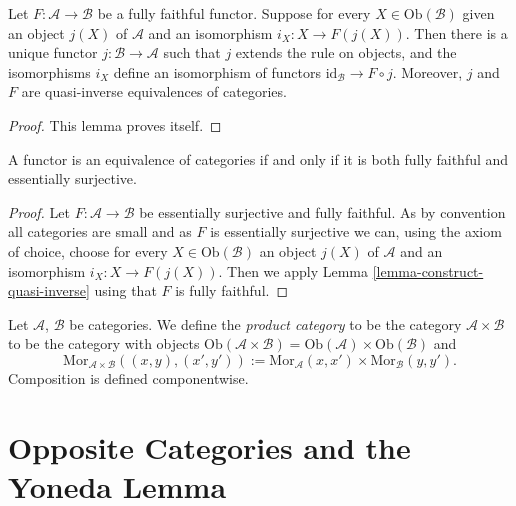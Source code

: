 \begin{lemma}
\label{lemma-construct-quasi-inverse}
Let $F : \mathcal{A} \to \mathcal{B}$ be a fully faithful functor.
Suppose for every $X \in \text{Ob}(\mathcal{B})$ given an
object $j(X)$ of $\mathcal{A}$ and an isomorphism $i_X : X \to F(j(X))$.
Then there is a unique functor $j : \mathcal{B} \to \mathcal{A}$
such that $j$ extends the rule on objects, and the isomorphisms
$i_X$ define an isomorphism of functors
$\text{id}_{\mathcal{B}} \to F \circ j$. Moreover, $j$ and $F$
are quasi-inverse equivalences of categories.
\end{lemma}

\begin{proof}
This lemma proves itself.
\end{proof}

\begin{lemma}
\label{lemma-equivalence-categories}
A functor is an equivalence of categories if and only if it is both fully
faithful and essentially surjective.
\end{lemma}

\begin{proof}
Let $F : \mathcal{A} \to \mathcal{B}$ be essentially surjective and fully
faithful. As by convention all categories are small and as $F$ is essentially
surjective we can, using the axiom of choice, choose for every
$X \in \text{Ob}(\mathcal{B})$ an object $j(X)$ of $\mathcal{A}$ and an
isomorphism $i_X : X \to F(j(X))$. Then we apply
Lemma \ref{lemma-construct-quasi-inverse}
using that $F$ is fully faithful.
\end{proof}

\begin{definition}
\label{definition-product-category}
Let $\mathcal{A}$, $\mathcal{B}$ be categories.
We define the {\it product category} to be the category
$\mathcal{A}\times \mathcal{B}$ to be the category with
objects
$\text{Ob}(\mathcal{A}\times \mathcal{B}) =
\text{Ob}(\mathcal{A}) \times \text{Ob}(\mathcal{B})$
and
$$
\text{Mor}_{\mathcal{A}\times \mathcal{B}}((x, y), (x', y'))
:=
\text{Mor}_{\mathcal{A}}(x, x')\times
\text{Mor}_{\mathcal{B}}(y, y').
$$
Composition is defined componentwise.
\end{definition}


\section{Opposite Categories and the Yoneda Lemma}
\label{section-opposite}

